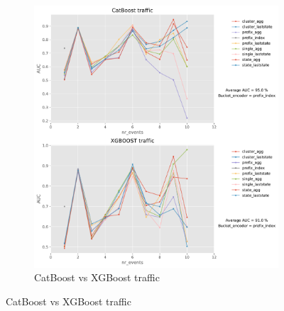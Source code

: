 \begin{figure}[!htb]
\begin{subfigure}{0.48\textwidth}
		\includegraphics[width=\linewidth]{images/catboost/graphs/traffic_CatBoost_xgboost.pdf}
		\caption{CatBoost vs XGBoost traffic} \label{fig:traf}
	\end{subfigure}
	

\end{figure}
